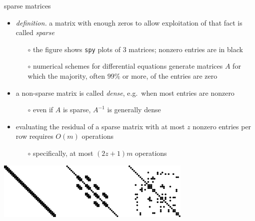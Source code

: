 \documentclass[10pt,hyperref]{beamer}
\begin{document}
\begin{frame}{sparse matrices}

\begin{itemize}
\item \emph{definition.}  a matrix with enough zeros to allow exploitation of that fact is called \emph{sparse}
  \begin{itemize}
  \item[$\circ$] the figure shows \texttt{spy} plots of 3 matrices; nonzero entries are in black
  \item[$\circ$] numerical schemes for differential equations generate matrices $A$ for which the majority, often $99\%$ or more, of the entries are zero
  \end{itemize}
\item a non-sparse matrix is called \emph{dense}, e.g.~when most entries are nonzero
  \begin{itemize}
  \item[$\circ$] even if $A$ is sparse, $A^{-1}$ is generally dense
  \end{itemize}
\item evaluating the residual of a sparse matrix with at most $z$ nonzero entries per row requires $O(m)$ operations
  \begin{itemize}
  \item[$\circ$] specifically, at most $(2z+1)m$ operations
  \end{itemize}
\end{itemize}

\bigskip
\begin{center}
\includegraphics[width=0.7\textwidth]{sparsities.png}
\end{center}
\end{frame}
\end{document}

